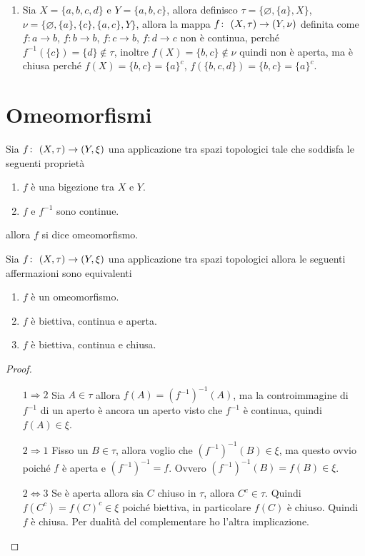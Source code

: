 \begin{example}
\begin{enumerate}
	\item Sia $X = \{a,b,c,d\}$  e $Y = \{a,b,c\}$, allora definisco $\tau = \{\varnothing, \{a\}, X\}$, $\nu = \{\varnothing, \{a\}, \{c\}, \{a,c\}, Y\}$, allora la mappa $f \colon\ (X,\tau) \rightarrow (Y,\nu)$ definita come $f \colon a \rightarrow b$,  $f \colon b \rightarrow b$, $f \colon c \rightarrow b$, $f \colon d \rightarrow c$ non è continua, perché $f^{-1}(\{c\}) = \{d\} \notin \tau$, inoltre $f(X) = \{b,c\} \notin \nu$ quindi non è aperta, ma è chiusa perché $f(X) = \{b,c\} = \{a\}^c$, $f(\{b,c,d\}) = \{b,c\} = \{a\}^c$.   
\end{enumerate}
\end{example}

\section{Omeomorfismi}

\begin{definition}
	Sia $f \colon\ (X,\tau) \rightarrow (Y,\xi)$ una applicazione tra spazi topologici tale che soddisfa le seguenti proprietà
	\begin{enumerate}
		\item $f$ è una bigezione tra $X$ e $Y$.
		\item $f$ e $f^{-1}$ sono continue.
	\end{enumerate} 
	allora $f$ si dice omeomorfismo. 
\end{definition}

\begin{theorem}
	Sia $f \colon\ (X,\tau) \rightarrow (Y,\xi)$ una applicazione tra spazi topologici allora le seguenti affermazioni sono equivalenti
	\begin{enumerate}
		\item $f$ è un omeomorfismo.
		\item $f$ è biettiva, continua e aperta.
		\item $f$ è biettiva, continua e chiusa.
	\end{enumerate}
\end{theorem}
\begin{proof}
	\begin{enumerate}
		\item[$1 \Rightarrow 2$] Sia $A \in \tau$ allora $f(A) = (f^{-1})^{-1}(A)$, ma la controimmagine di $f^{-1}$ di un aperto è ancora un aperto visto che $f^{-1}$ è continua, quindi $f(A) \in \xi$.
		\item[$2 \Rightarrow 1$] Fisso un $B \in \tau$, allora voglio che $(f^{-1})^{-1}(B) \in \xi$, ma questo ovvio poiché $f$ è aperta e $(f^{-1})^{-1} = f$. Ovvero $(f^{-1})^{-1}(B) = f(B) \in \xi$.
		\item[$2\Leftrightarrow 3$] Se è aperta allora sia $C$ chiuso in $\tau$, allora $C^{c} \in \tau$. Quindi $f(C^c) = f(C)^c \in \xi$ poiché biettiva, in particolare $f(C)$ è chiuso. Quindi $f$ è chiusa. Per dualità del complementare ho l'altra implicazione.
	\end{enumerate}
\end{proof}

